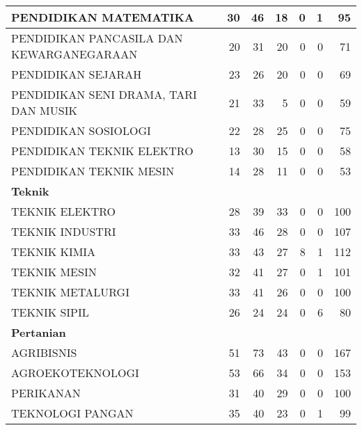 \documentclass[
]{book}
\begin{document}
\begin{table}[H]
{\begin{tabular}{l|r|r|r|r|r|r}
\hline
\hspace{1em}PENDIDIKAN MATEMATIKA & 30 & 46 & 18 & 0 & 1 & 95\\
\hline
\hspace{1em}PENDIDIKAN PANCASILA DAN KEWARGANEGARAAN & 20 & 31 & 20 & 0 & 0 & 71\\
\hline
\hspace{1em}PENDIDIKAN SEJARAH & 23 & 26 & 20 & 0 & 0 & 69\\
\hline
\hspace{1em}PENDIDIKAN SENI DRAMA, TARI DAN MUSIK & 21 & 33 & 5 & 0 & 0 & 59\\
\hline
\hspace{1em}PENDIDIKAN SOSIOLOGI & 22 & 28 & 25 & 0 & 0 & 75\\
\hline
\hspace{1em}PENDIDIKAN TEKNIK ELEKTRO & 13 & 30 & 15 & 0 & 0 & 58\\
\hline
\hspace{1em}PENDIDIKAN TEKNIK MESIN & 14 & 28 & 11 & 0 & 0 & 53\\
\hline
\multicolumn{7}{l}{\textbf{Teknik}}\\
\hline
\hspace{1em}TEKNIK ELEKTRO & 28 & 39 & 33 & 0 & 0 & 100\\
\hline
\hspace{1em}TEKNIK INDUSTRI & 33 & 46 & 28 & 0 & 0 & 107\\
\hline
\hspace{1em}TEKNIK KIMIA & 33 & 43 & 27 & 8 & 1 & 112\\
\hline
\hspace{1em}TEKNIK MESIN & 32 & 41 & 27 & 0 & 1 & 101\\
\hline
\hspace{1em}TEKNIK METALURGI & 33 & 41 & 26 & 0 & 0 & 100\\
\hline
\hspace{1em}TEKNIK SIPIL & 26 & 24 & 24 & 0 & 6 & 80\\
\hline
\multicolumn{7}{l}{\textbf{Pertanian}}\\
\hline
\hspace{1em}AGRIBISNIS & 51 & 73 & 43 & 0 & 0 & 167\\
\hline
\hspace{1em}AGROEKOTEKNOLOGI & 53 & 66 & 34 & 0 & 0 & 153\\
\hline
\hspace{1em}PERIKANAN & 31 & 40 & 29 & 0 & 0 & 100\\
\hline
\hspace{1em}TEKNOLOGI PANGAN & 35 & 40 & 23 & 0 & 1 & 99\\

\end{tabular}}
\end{table}
\end{document}
